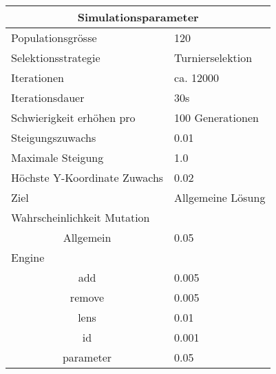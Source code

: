 
\begin{tabular}{ | l | l | }

  \hline
  \multicolumn{2}{|c|}{Simulationsparameter} \\
  \hline
  Populationsgrösse & 120 \\ \hline
  Selektionsstrategie & Turnierselektion \\ \hline
  Iterationen & ca. 12000 \\ \hline
  Iterationsdauer & 30s \\ \hline
  Schwierigkeit erhöhen pro & 100 Generationen \\ \hline
  Steigungszuwachs & 0.01 \\ \hline
  Maximale Steigung & 1.0 \\ \hline
  Höchste Y-Koordinate Zuwachs  & 0.02 \\ \hline
  Ziel & Allgemeine Lösung \\ \hline
  \multicolumn{2}{|l|}{Wahrscheinlichkeit Mutation}\\ \hline
  \multicolumn{1}{|c|}{Allgemein} & 0.05 \\ \hline
  Engine &  \\ \hline
  \multicolumn{1}{|c|}{add} & 0.005 \\ \hline
  \multicolumn{1}{|c|}{remove} & 0.005 \\ \hline
  \multicolumn{1}{|c|}{lens} & 0.01 \\ \hline
  \multicolumn{1}{|c|}{id} & 0.001 \\ \hline
  \multicolumn{1}{|c|}{parameter} & 0.05 \\ \hline

\end{tabular}
